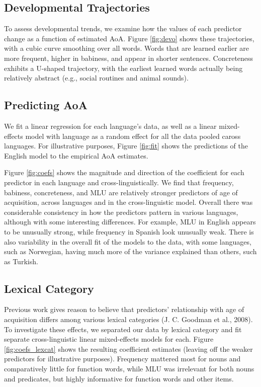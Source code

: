 \documentclass[10pt, letterpaper]{article}
\begin{document}
\subsection{Developmental
Trajectories}\label{developmental-trajectories}

To assess developmental trends, we examine how the values of each
predictor change as a function of estimated AoA. Figure \ref{fig:devo}
shows these trajectories, with a cubic curve smoothing over all words.
Words that are learned earlier are more frequent, higher in babiness,
and appear in shorter sentences. Concreteness exhibits a U-shaped
trajectory, with the earliest learned words actually being relatively
abstract (e.g., social routines and animal sounds).

\subsection{Predicting AoA}\label{predicting-aoa}

We fit a linear regression for each language's data, as well as a linear
mixed-effects model with language as a random effect for all the data
pooled caross languages. For illustrative purposes, Figure \ref{fig:fit}
shows the predictions of the English model to the empirical AoA
estimates.

Figure \ref{fig:coefs} shows the magnitude and direction of the
coefficient for each predictor in each language and
cross-linguistically. We find that frequency, babiness, concreteness,
and MLU are relatively stronger predictors of age of acquisition, across
languages and in the cross-linguistic model. Overall there was
considerable consistency in how the predictors pattern in various
languages, although with some interesting differences. For example, MLU
in English appears to be unusually strong, while frequency in Spanish
look unusually weak. There is also variability in the overall fit of the
models to the data, with some languages, such as Norwegian, having much
more of the variance explained than others, such as Turkish.

\subsection{Lexical Category}\label{lexical-category}

Previous work gives reason to believe that predictors' relationship with
age of acquisition differs among various lexical categories (J. C.
Goodman et al., 2008). To investigate these effects, we separated our
data by lexical category and fit separate cross-linguistic linear
mixed-effects models for each. Figure \ref{fig:coefs_lexcat} shows the
resulting coefficient estimates (leaving off the weaker predictors for
illustrative purposes). Frequency mattered most for nouns and
comparatively little for function words, while MLU was irrelevant for
both nouns and predicates, but highly informative for function words and
other items.
\end{document}
